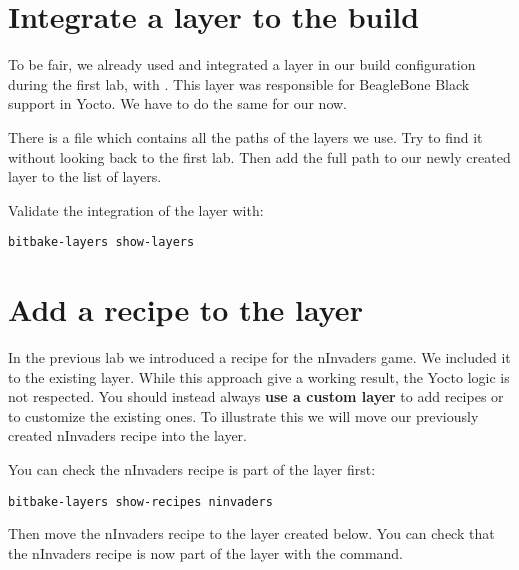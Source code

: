 \section{Integrate a layer to the build}

To be fair, we already used and integrated a layer in our build configuration
during the first lab, with . This layer was responsible for
BeagleBone Black support in Yocto. We have to do the same for our
 now.

There is a file which contains all the paths of the layers we use. Try to find it
without looking back to the first lab. Then add the full path to our newly
created layer to the list of layers.

Validate the integration of the  layer with:
\begin{verbatim}
bitbake-layers show-layers
\end{verbatim}

\section{Add a recipe to the layer}

In the previous lab we introduced a recipe for the nInvaders game. We included
it to the existing  layer. While this approach give a working result,
the Yocto logic is not respected. You should instead always \textbf{use a custom layer}
to add recipes or to customize the existing ones. To illustrate this we will
move our previously created nInvaders recipe into the  layer.

You can check the nInvaders recipe is part of the  layer first:
\begin{verbatim}
bitbake-layers show-recipes ninvaders
\end{verbatim}

Then move the nInvaders recipe to the layer created below. You can check that
the nInvaders recipe is now part of the  layer with the
 command.

